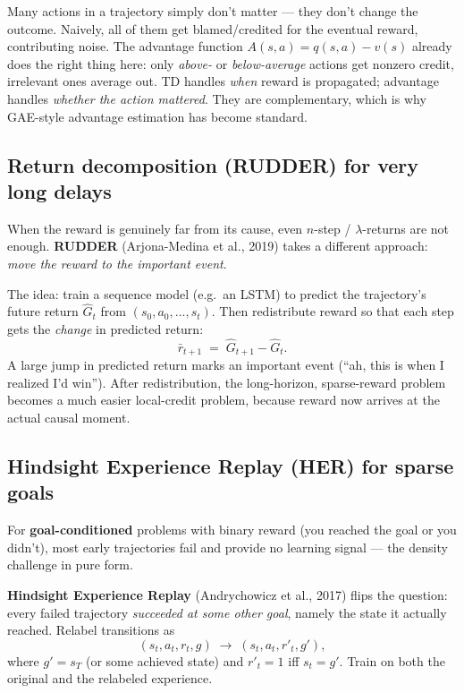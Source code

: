 \documentclass[11pt, oneside]{book}
\begin{document}
Many actions in a trajectory simply don't matter --- they don't change the outcome.
Naively, all of them get blamed/credited for the eventual reward, contributing noise.
The advantage function $A(s,a) = q(s,a) - v(s)$ already does the right thing here:
only \emph{above-} or \emph{below-average} actions get nonzero credit, irrelevant ones
average out.
TD handles \emph{when} reward is propagated; advantage handles \emph{whether the action
mattered}. They are complementary, which is why GAE-style advantage estimation has
become standard.

\subsection{Return decomposition (RUDDER) for very long delays}

When the reward is genuinely far from its cause, even $n$-step / $\lambda$-returns are
not enough.
\textbf{RUDDER} (Arjona-Medina et al., 2019) takes a different approach: \emph{move the
reward to the important event}.

The idea: train a sequence model (e.g.\ an LSTM) to predict the trajectory's future
return $\hat G_t$ from $(s_0, a_0, \dots, s_t)$. Then redistribute reward so that each
step gets the \emph{change} in predicted return:
\[
  \bar r_{t+1} \;=\; \hat G_{t+1} - \hat G_t.
\]
A large jump in predicted return marks an important event (``ah, this is when I
realized I'd win''). After redistribution, the long-horizon, sparse-reward problem
becomes a much easier local-credit problem, because reward now arrives at the actual
causal moment.

\subsection{Hindsight Experience Replay (HER) for sparse goals}

For \textbf{goal-conditioned} problems with binary reward (you reached the goal or you
didn't), most early trajectories fail and provide no learning signal --- the density
challenge in pure form.

\textbf{Hindsight Experience Replay} (Andrychowicz et al., 2017) flips the question:
every failed trajectory \emph{succeeded at some other goal}, namely the state it
actually reached. Relabel transitions as
\[
  (s_t, a_t, r_t, g) \;\longrightarrow\; (s_t, a_t, r'_t, g'),
\]
where $g' = s_T$ (or some achieved state) and $r'_t = 1$ iff $s_t = g'$. Train on
both the original and the relabeled experience.
\end{document}
